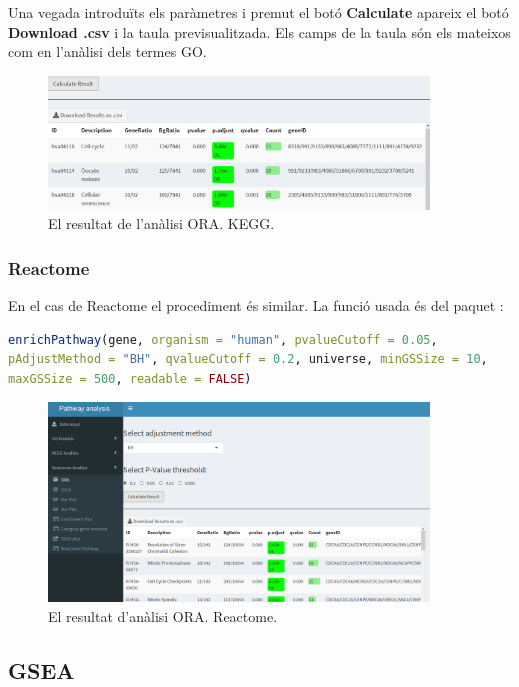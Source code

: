 \documentclass[]{article}
\begin{document}
Una vegada introduïts els paràmetres i premut el botó \textbf{Calculate} apareix el botó \textbf{Download .csv} i la taula previsualitzada. Els camps de la taula són els mateixos com en l'anàlisi dels termes GO.
\begin{figure}[H]
\centering
\includegraphics[width=0.9\textwidth]{App_F9_Items_KEGG_ORA_Table.png} 
\caption{El resultat de l'anàlisi ORA. KEGG.}
\end{figure}

\subsubsection{Reactome}
En el cas de Reactome el procediment és similar. La funció usada és  del paquet :

\begin{lstlisting}[language=R]
enrichPathway(gene, organism = "human", pvalueCutoff = 0.05,
pAdjustMethod = "BH", qvalueCutoff = 0.2, universe, minGSSize = 10,
maxGSSize = 500, readable = FALSE)
\end{lstlisting}


\begin{figure}[H]
\centering
\includegraphics[width=0.9\textwidth]{App_F10_Items_Reactome_ORA.png} 
\caption{El resultat d'anàlisi ORA. Reactome.}
\end{figure}

\subsection{GSEA}
\end{document}
